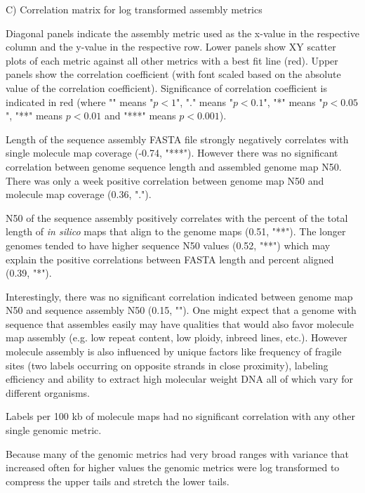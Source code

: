C) Correlation matrix for log transformed assembly metrics

Diagonal panels indicate the assembly metric used as the x-value in the respective column and the y-value in the respective row. Lower panels show XY scatter plots of each metric against all other metrics with a best fit line (red). Upper panels show the correlation coefficient (with font scaled based on the absolute value of the correlation coefficient). Significance of correlation coefficient is indicated in red (where "" means "$p< 1$", "." means "$p< 0.1$", "*" means "$p< 0.05$", "**" means $p< 0.01$ and "***" means $p< 0.001$).

Length of the sequence assembly FASTA file strongly negatively correlates with single molecule map coverage (-0.74, "***"). However there was no significant correlation between genome sequence length and assembled genome map N50. There was only a week positive correlation between genome map N50 and molecule map coverage (0.36, "."). 

N50 of the sequence assembly positively correlates with the percent of the total length of \textit{in silico} maps that align to the genome maps (0.51, "**"). The longer genomes tended to have higher sequence N50 values (0.52, "**") which may explain the positive correlations between FASTA length and percent aligned (0.39, "*").

Interestingly, there was no significant correlation indicated between genome map N50 and sequence assembly N50 (0.15, ""). One might expect that a genome with sequence that assembles easily may have qualities that would also favor molecule map assembly (e.g. low repeat content, low ploidy, inbreed lines, etc.). However molecule assembly is also influenced by unique factors like frequency of fragile sites (two labels occurring on opposite strands in close proximity), labeling efficiency and ability to extract high molecular weight DNA all of which vary for different organisms.

Labels per 100 kb of molecule maps had no significant correlation with any other single genomic metric.

Because many of the genomic metrics had very broad ranges with variance that increased often for higher values the genomic metrics were log transformed to compress the upper tails and stretch the lower tails.

